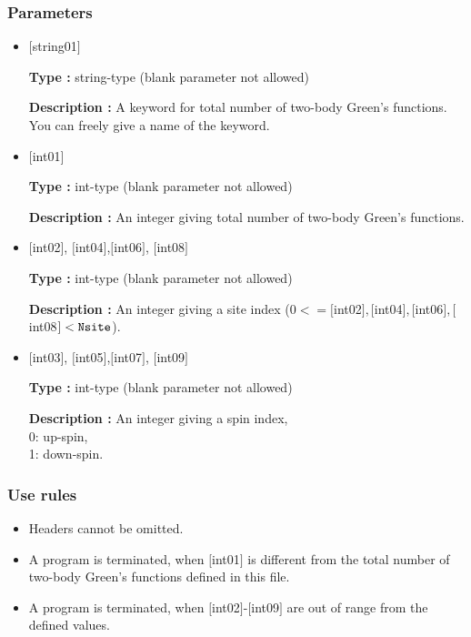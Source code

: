 \subsubsection{Parameters}
 \begin{itemize}
    \item  $[$string01$]$
   
    {\bf Type :} string-type (blank parameter not allowed)

   {\bf Description :} A keyword for total number of two-body Green's functions. You can freely give a name of the keyword.

   \item  $[$int01$]$
   
    {\bf Type :} int-type (blank parameter not allowed)

   {\bf Description :}  An integer giving total number of two-body Green's functions.


  \item  $[$int02$]$, $[$int04$]$,$[$int06$]$, $[$int08$]$

 {\bf Type :} int-type (blank parameter not allowed)

{\bf Description :} An integer giving a site index ($0<= [$int02$], [$int04$], [$int06$], [$int08$]<\verb|Nsite|$).
 
  \item  $[$int03$]$, $[$int05$]$,$[$int07$]$, $[$int09$]$

 {\bf Type :} int-type (blank parameter not allowed)

{\bf Description :} 
An integer giving a spin index,\\
0: up-spin,\\
1: down-spin.

\end{itemize}

\subsubsection{Use rules}
\begin{itemize}
\item Headers cannot be omitted. 
\item A program is terminated, when $[$int01$]$ is different from the total number of two-body Green's functions defined in this file.
\item A program is terminated, when $[$int02$]$-$[$int09$]$ are out of range from the defined values.
\end{itemize}

